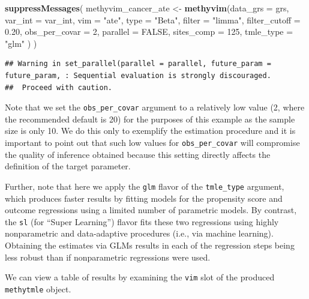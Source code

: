 \documentclass[9pt,a4paper,]{extarticle}
\newenvironment{Shaded}{\begin{snugshade}}{\end{snugshade}}
\newcommand{\KeywordTok}[1]{\textcolor[rgb]{0.13,0.29,0.53}{\textbf{#1}}}
\newcommand{\DataTypeTok}[1]{\textcolor[rgb]{0.13,0.29,0.53}{#1}}
\newcommand{\DecValTok}[1]{\textcolor[rgb]{0.00,0.00,0.81}{#1}}
\newcommand{\FloatTok}[1]{\textcolor[rgb]{0.00,0.00,0.81}{#1}}
\newcommand{\StringTok}[1]{\textcolor[rgb]{0.31,0.60,0.02}{#1}}
\newcommand{\OtherTok}[1]{\textcolor[rgb]{0.56,0.35,0.01}{#1}}
\newcommand{\NormalTok}[1]{#1}
\theoremstyle{definition}
\theoremstyle{definition}
\theoremstyle{definition}
\theoremstyle{remark}
\begin{document}
\begin{Shaded}
\begin{Highlighting}[]
\KeywordTok{suppressMessages}\NormalTok{(}
\NormalTok{  methyvim_cancer_ate <-}\StringTok{ }\KeywordTok{methyvim}\NormalTok{(}\DataTypeTok{data_grs =}\NormalTok{ grs, }\DataTypeTok{var_int =}\NormalTok{ var_int,}
                                  \DataTypeTok{vim =} \StringTok{"ate"}\NormalTok{, }\DataTypeTok{type =} \StringTok{"Beta"}\NormalTok{, }\DataTypeTok{filter =} \StringTok{"limma"}\NormalTok{,}
                                  \DataTypeTok{filter_cutoff =} \FloatTok{0.20}\NormalTok{, }\DataTypeTok{obs_per_covar =} \DecValTok{2}\NormalTok{,}
                                  \DataTypeTok{parallel =} \OtherTok{FALSE}\NormalTok{, }\DataTypeTok{sites_comp =} \DecValTok{125}\NormalTok{,}
                                  \DataTypeTok{tmle_type =} \StringTok{"glm"}
\NormalTok{                                 )}
\NormalTok{)}
\end{Highlighting}
\end{Shaded}

\begin{verbatim}
## Warning in set_parallel(parallel = parallel, future_param = future_param, : Sequential evaluation is strongly discouraged. 
##  Proceed with caution.
\end{verbatim}

Note that we set the \texttt{obs\_per\_covar} argument to a relatively
low value (2, where the recommended default is 20) for the purposes of
this example as the sample size is only 10. We do this only to exemplify
the estimation procedure and it is important to point out that such low
values for \texttt{obs\_per\_covar} will compromise the quality of
inference obtained because this setting directly affects the definition
of the target parameter.

Further, note that here we apply the \texttt{glm} flavor of the
\texttt{tmle\_type} argument, which produces faster results by fitting
models for the propensity score and outcome regressions using a limited
number of parametric models. By contrast, the \texttt{sl} (for ``Super
Learning'') flavor fits these two regressions using highly nonparametric
and data-adaptive procedures (i.e., via machine learning). Obtaining the
estimates via GLMs results in each of the regression steps being less
robust than if nonparametric regressions were used.

We can view a table of results by examining the \texttt{vim} slot of the
produced \texttt{methytmle} object.
\end{document}

